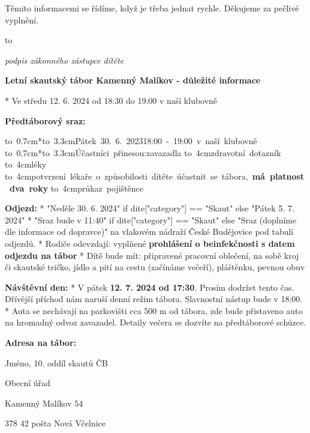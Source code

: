 Těmito informacemi se řídíme, když je třeba jednat rychle. Děkujeme za pečlivé vyplnění.
\smallskip

\hbox to 

{\hfill\it\typosize[7/13]podpis zákonného zástupce dítěte}

\vfil\break

\centerline{\typosize[14/13]\bf Letní skautský tábor Kamenný Malíkov - důležité informace}
\bigskip


\begitems
* Ve středu 12. 6. 2024 od 18:30 do 19:00 v naší klubovně
\enditems

{\bf Předtáborový sraz:}

\begitems
\hbox{\hbox to 0.7cm{}*\hbox to 3.3cm{Pátek 30. 6. 2023\hfil}18:00 - 19:00 v naší klubovně}
\hbox{\hbox to 0.7cm{}*\hbox to 3.3cm{Účastníci přinesou:\hfil}zavazadla}
\hbox{\hbox to 4cm{\hfil}zdravotní dotazník}
\hbox{\hbox to 4cm{\hfil}léky}
\hbox{\hbox to 4cm{\hfil}potvrzení lékaře o způsobilosti dítěte účastnit se tábora, \bf má platnost dva roky}
\hbox{\hbox to 4cm{\hfil}průkaz pojištěnce}
\enditems

{\bf Odjezd:}
\begitems
* {{ "Neděle 30. 6. 2024" if dite["category"] == "Skaut" else "Pátek 5. 7. 2024" }}
* {{"Sraz bude v 11:40" if dite["category"] == "Skaut" else "Sraz (doplníme dle informace od dopravce)"}} na vlakovém nádraží České Budějovice pod tabulí odjezdů.
* Rodiče odevzdají: vyplňené {\bf prohlášení o beinfekčnosti s datem odjezdu na tábor}
* Dítě bude mít: připravené pracovní oblečení, na sobě kroj či skautské tričko, jídlo a pití na cestu (začínáme večeří), pláštěnku, pevnou obuv
\enditems

{\bf Návštěvní den:}
\begitems
* V pátek {\bf 12. 7. 2024 od 17:30}. Prosím dodržet tento čas. Dřívější příchod nám naruší denní režim tábora. Slavnostní nástup bude v 18:00. 
* Auta se nechávají na parkovišti cca 500 m od tábora, zde bude přistaveno auto na hromadný odvoz zavazadel. Detaily večera se dozvíte na předtáborové schůzce.
\enditems

{\bf Adresa na tábor:}

\parindent=4cm

Jméno, 10. oddíl skautů ČB

Obecní úřad

Kamenný Malíkov 54

378 42 pošta Nová Včelnice


